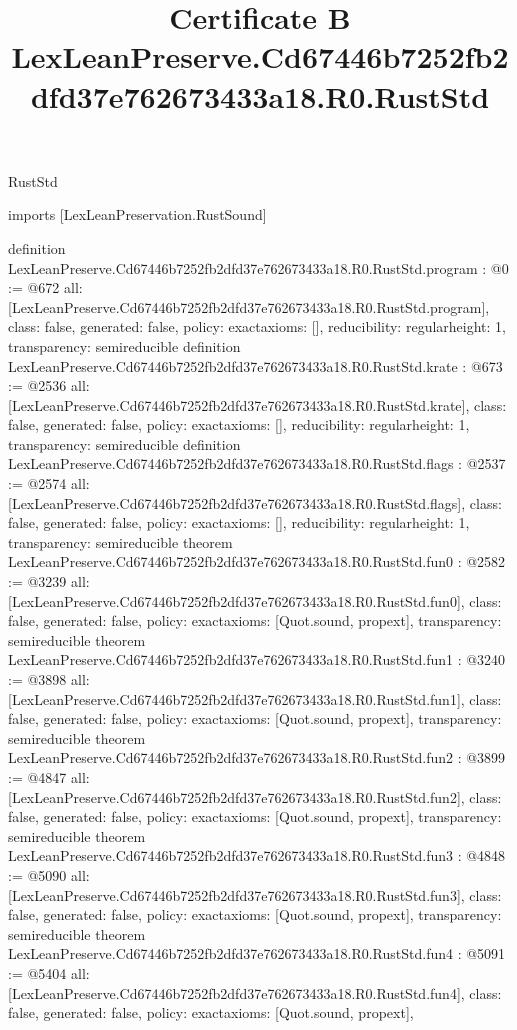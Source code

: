 \begin{lexlean}{RustStd}
\title{Certificate B LexLeanPreserve.Cd67446b7252fb2dfd37e762673433a18.R0.RustStd}
\begin{coremodule}
imports [LexLeanPreservation.RustSound]

definition LexLeanPreserve.Cd67446b7252fb2dfd37e762673433a18.R0.RustStd.program : @0 := @672 {
  all: [LexLeanPreserve.Cd67446b7252fb2dfd37e762673433a18.R0.RustStd.program],
  class: false,
  generated: false,
  policy: exact{axioms: []},
  reducibility: regular{height: 1},
  transparency: semireducible
}
definition LexLeanPreserve.Cd67446b7252fb2dfd37e762673433a18.R0.RustStd.krate : @673 := @2536 {
  all: [LexLeanPreserve.Cd67446b7252fb2dfd37e762673433a18.R0.RustStd.krate],
  class: false,
  generated: false,
  policy: exact{axioms: []},
  reducibility: regular{height: 1},
  transparency: semireducible
}
definition LexLeanPreserve.Cd67446b7252fb2dfd37e762673433a18.R0.RustStd.flags : @2537 := @2574 {
  all: [LexLeanPreserve.Cd67446b7252fb2dfd37e762673433a18.R0.RustStd.flags],
  class: false,
  generated: false,
  policy: exact{axioms: []},
  reducibility: regular{height: 1},
  transparency: semireducible
}
theorem LexLeanPreserve.Cd67446b7252fb2dfd37e762673433a18.R0.RustStd.fun0 : @2582 := @3239 {
  all: [LexLeanPreserve.Cd67446b7252fb2dfd37e762673433a18.R0.RustStd.fun0],
  class: false,
  generated: false,
  policy: exact{axioms: [Quot.sound, propext]},
  transparency: semireducible
}
theorem LexLeanPreserve.Cd67446b7252fb2dfd37e762673433a18.R0.RustStd.fun1 : @3240 := @3898 {
  all: [LexLeanPreserve.Cd67446b7252fb2dfd37e762673433a18.R0.RustStd.fun1],
  class: false,
  generated: false,
  policy: exact{axioms: [Quot.sound, propext]},
  transparency: semireducible
}
theorem LexLeanPreserve.Cd67446b7252fb2dfd37e762673433a18.R0.RustStd.fun2 : @3899 := @4847 {
  all: [LexLeanPreserve.Cd67446b7252fb2dfd37e762673433a18.R0.RustStd.fun2],
  class: false,
  generated: false,
  policy: exact{axioms: [Quot.sound, propext]},
  transparency: semireducible
}
theorem LexLeanPreserve.Cd67446b7252fb2dfd37e762673433a18.R0.RustStd.fun3 : @4848 := @5090 {
  all: [LexLeanPreserve.Cd67446b7252fb2dfd37e762673433a18.R0.RustStd.fun3],
  class: false,
  generated: false,
  policy: exact{axioms: [Quot.sound, propext]},
  transparency: semireducible
}
theorem LexLeanPreserve.Cd67446b7252fb2dfd37e762673433a18.R0.RustStd.fun4 : @5091 := @5404 {
  all: [LexLeanPreserve.Cd67446b7252fb2dfd37e762673433a18.R0.RustStd.fun4],
  class: false,
  generated: false,
  policy: exact{axioms: [Quot.sound, propext]},
}
\end{coremodule}
\end{lexlean}
